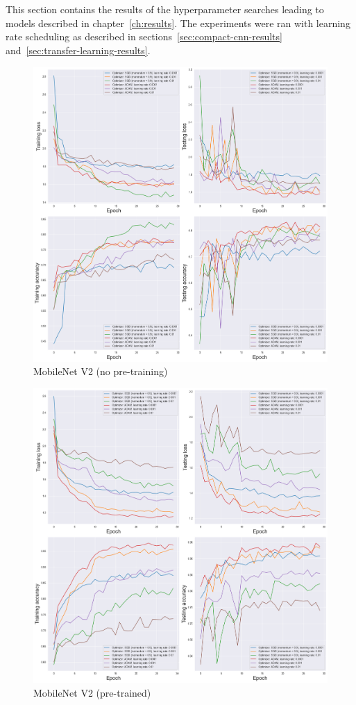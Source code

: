 This section contains the results of the hyperparameter searches leading to models described in chapter~\ref{ch:results}.
The experiments were ran with learning rate scheduling as described in sections~\ref{sec:compact-cnn-results} and~\ref{sec:transfer-learning-results}.
\begin{figure}[!ht]
    \centering
    \includegraphics[width=\textwidth]{figures/gridsearches/mobilenet}
    \caption{MobileNet V2 (no pre-training)}
    \label{fig:mobilenetNoPtGridSearch}
\end{figure}
\begin{figure}[!ht]
    \centering
    \includegraphics[width=\textwidth]{figures/gridsearches/mobilenet_pt}
    \caption{MobileNet V2 (pre-trained)}
    \label{fig:mobilenetPtGridSearch}
\end{figure}
